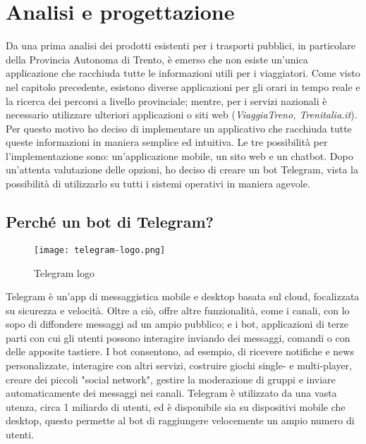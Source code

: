 \chapter{Analisi e progettazione}
\label{cha:analisi_progettazione}
Da una prima analisi dei prodotti esistenti per i trasporti pubblici, in particolare della Provincia Autonoma di Trento, è emerso che non esiste un'unica applicazione che racchiuda tutte le informazioni utili per i viaggiatori. Come visto nel capitolo precedente, esistono diverse applicazioni per gli orari in tempo reale e la ricerca dei percorsi a livello provinciale; mentre, per i servizi nazionali è necessario utilizzare ulteriori applicazioni o siti web (\textit{ViaggiaTreno, Trenitalia.it}).
Per questo motivo ho deciso di implementare un applicativo che racchiuda tutte queste informazioni in maniera semplice ed intuitiva. 
Le tre possibilità per l'implementazione sono: un'applicazione mobile, un sito web e un chatbot. Dopo un'attenta valutazione delle opzioni, ho deciso di creare un bot Telegram, vista la possibilità di utilizzarlo su tutti i sistemi operativi in maniera agevole.  

\section{Perché un bot di Telegram?}

\begin{wrapfigure}{r}{0.33\textwidth}
\centering
\texttt{[image: telegram-logo.png]}
\caption{Telegram logo}
\label{fig:telegram_logo}
\end{wrapfigure}

Telegram è un'app di messaggistica mobile e desktop basata sul cloud, focalizzata su sicurezza e velocità. \cite{Telegram} Oltre a ciò, offre altre funzionalità, come i canali, con lo sopo di diffondere messaggi ad un ampio pubblico; e i bot, applicazioni di terze parti con cui gli utenti possono interagire inviando dei messaggi, comandi o con delle apposite tastiere. I bot consentono, ad esempio, di ricevere notifiche e news personalizzate, interagire con altri servizi, costruire giochi single- e multi-player, creare dei piccoli "social network", gestire la moderazione di gruppi e inviare automaticamente dei messaggi nei canali. 
Telegram è utilizzato da una vasta utenza, circa 1 miliardo di utenti, ed è disponibile sia su dispositivi mobile che desktop, questo permette al bot di raggiungere velocemente un ampio numero di utenti. 

